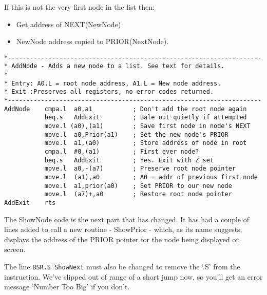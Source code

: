 If this is not the very first node in the list then:
\begin{itemize}[itemsep=0pt]

\item{}Get address of NEXT(NewNode)


\item{}NewNode address copied to PRIOR(NextNode).

\end{itemize}

\begin{lstlisting}[firstnumber=43,caption={Doubly Linked List - Demo Code - Add Node}]
*---------------------------------------------------------------------
* AddNode - Adds a new node to a list. See text for details.
*
* Entry: A0.L = root node address, A1.L = New node address.
* Exit :Preserves all registers, no error codes returned.
*---------------------------------------------------------------------
AddNode    cmpa.l  a0,a1           ; Don't add the root node again
           beq.s   AddExit         ; Bale out quietly if attempted
           move.l (a0),(a1)        ; Save first node in node's NEXT 
           move.l  a0,Prior(a1)    ; Set the new node's PRIOR
           move.l  a1,(a0)         ; Store address of node in root
           cmpa.l  #0,(a1)         ; First ever node?
           beq.s   AddExit         ; Yes. Exit with Z set
           move.l  a0,-(a7)        ; Preserve root node pointer
           move.l  (a1),a0         ; A0 = addr of previous first node
           move.l  a1,prior(a0)    ; Set PRIOR to our new node
           move.l  (a7)+,a0        ; Restore root node pointer
AddExit    rts
\end{lstlisting}

The ShowNode code is the next part that has changed. It has had a couple of lines added
to call a new routine -{} ShowPrior -{} which, as its name suggests, displays the address of
the PRIOR pointer for the node being displayed on screen.

\begin{warning}
The line \lstinline{BSR.S ShowNext} must also be changed to remove the `.S' from the  instruction. We've slipped out of range of a short jump now, so you'll get an error message `Number Too Big' if you don't.
\end{warning}

